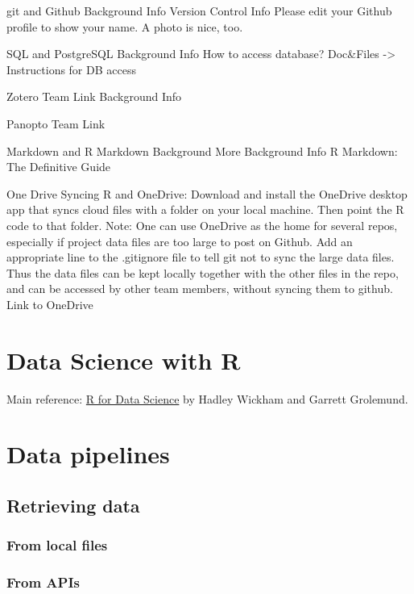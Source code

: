 \documentclass[
]{book}
\begin{document}
git and Github
Background Info
Version Control Info
Please edit your Github profile to show your name. A photo is nice, too.

SQL and PostgreSQL
Background Info
How to access database?
Doc\&Files -\textgreater{} Instructions for DB access

Zotero
Team Link
Background Info

Panopto
Team Link

Markdown and R Markdown
Background
More Background Info
R Markdown: The Definitive Guide

One Drive
Syncing R and OneDrive: Download and install the OneDrive desktop app that syncs cloud files with a folder on your local machine. Then point the R code to that folder.
Note: One can use OneDrive as the home for several repos, especially if project data files are too large to post on Github. Add an appropriate line to the .gitignore file to tell git not to sync the large data files. Thus the data files can be kept locally together with the other files in the repo, and can be accessed by other team members, without syncing them to github.
Link to OneDrive

\hypertarget{data-science-with-r}{%
\chapter{Data Science with R}\label{data-science-with-r}}

Main reference: \href{https://r4ds.had.co.nz/}{R for Data Science} by Hadley Wickham and Garrett Grolemund.

\hypertarget{data-pipelines}{%
\chapter{Data pipelines}\label{data-pipelines}}

\hypertarget{retrieving-data}{%
\section{Retrieving data}\label{retrieving-data}}

\hypertarget{from-local-files}{%
\subsection{From local files}\label{from-local-files}}

\hypertarget{from-apis}{%
\subsection{From APIs}\label{from-apis}}
\end{document}
